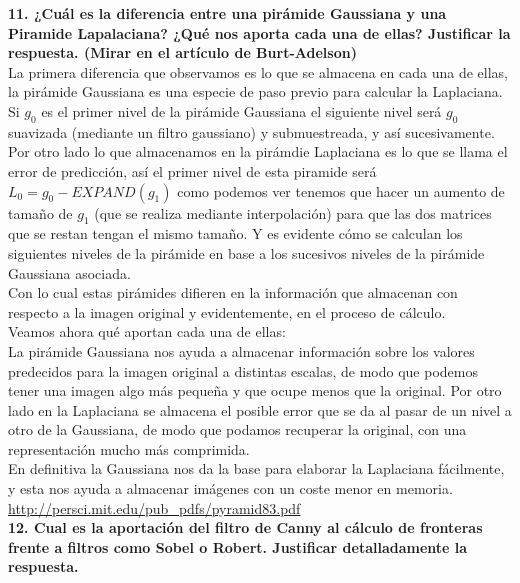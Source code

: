 \documentclass[10pt,a4paper]{article}
\begin{document}
\textbf{11. ¿Cuál es la diferencia entre una pirámide Gaussiana y una Piramide
Lapalaciana? ¿Qué nos aporta cada una de ellas? Justificar la respuesta.
(Mirar en el artículo de Burt-Adelson)}\\

La primera diferencia que observamos es lo que se almacena en cada una de ellas, la pirámide Gaussiana es una especie de paso previo para calcular la Laplaciana. Si $g_{0}$ es el primer nivel de la pirámide Gaussiana el siguiente nivel será $g_{0}$ suavizada (mediante un filtro gaussiano) y submuestreada, y así sucesivamente.\\

Por otro lado lo que almacenamos en la pirámdie Laplaciana es lo que se llama el error de predicción, así el primer nivel de esta piramide será $L_{0} = g_0 - EXPAND(g_1)$ como podemos ver tenemos que hacer un aumento de tamaño de $g_1$ (que se realiza mediante interpolación) para que las dos matrices que se restan tengan el mismo tamaño. Y es evidente cómo se calculan los siguientes niveles de la pirámide en base a los sucesivos niveles de la pirámide Gaussiana asociada.\\

Con lo cual estas pirámides difieren en la información que almacenan con respecto a la imagen original y evidentemente, en el proceso de cálculo.\\

Veamos ahora qué aportan cada una de ellas:\\

La pirámide Gaussiana nos ayuda a almacenar información sobre los valores predecidos para la imagen original a distintas escalas, de modo que podemos tener una imagen algo más pequeña y que ocupe menos que la original. Por otro lado en la Laplaciana se almacena el posible error que se da al pasar de un nivel a otro de la Gaussiana, de modo que podamos recuperar la original, con una representación mucho más comprimida.\\

En definitiva la Gaussiana nos da la base para elaborar la Laplaciana fácilmente, y esta nos ayuda a almacenar imágenes con un coste menor en memoria.\\

\url{http://persci.mit.edu/pub_pdfs/pyramid83.pdf}\\

\textbf{12. Cual es la aportación del filtro de Canny al cálculo de fronteras
frente a filtros como Sobel o Robert. Justificar detalladamente la
respuesta.}\\
\end{document}
